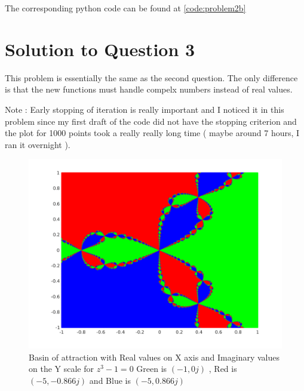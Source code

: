 \documentclass[a4paper,11pt]{article}
\begin{document}
The corresponding python code can be found at \ref{code:problem2b}
\clearpage

\section{Solution to Question 3}\label{prob3}

This problem is essentially the same as the second question. The only difference is that the new functions must handle compelx numbers instead of real values.

Note : Early stopping of iteration is really important and I noticed it in this problem since my first draft of the code did not have the stopping criterion and the plot for 1000 points took a really really long time ( maybe around 7 hours, I ran it overnight ). 

\begin{figure}[h]
	\centering
	\includegraphics[scale=0.45]{Basin_1000.png}
	\caption{Basin of attraction with Real values on X axis and Imaginary values on the Y scale for $z^3 - 1 = 0$  Green is $(-1,0j)$ , Red is $(-5, -0.866j)$ and Blue is $(-5, 0.866j)$}
	\label{fig:basin1000}
\end{figure}
\end{document}
